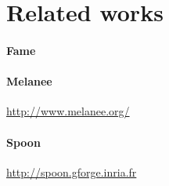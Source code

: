 
\section{Related works}

\paragraph{Fame} 
\cite{kuhn2008fame}

\paragraph{Melanee}
\url{http://www.melanee.org/}
\cite{atkinson11}

\paragraph{Spoon}
\url{http://spoon.gforge.inria.fr}
\cite{pawlak2016}